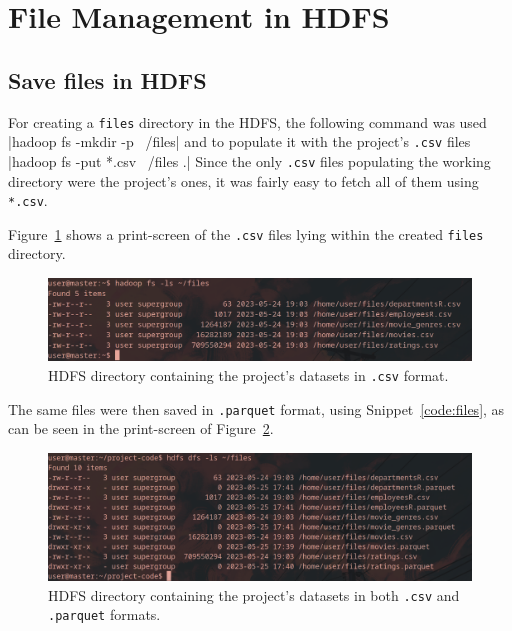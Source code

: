 \documentclass[12pt,twoside]{article}
\begin{document}
\section{File Management in HDFS}
\subsection{Save files in HDFS}
For creating a \texttt{files} directory in the HDFS, the following command was used
|hadoop fs -mkdir -p ~/files|
\noindent and to populate it with the project's \texttt{.csv} files
|hadoop fs -put *.csv ~/files .|
\noindent Since the only \texttt{.csv} files populating the working directory were the project's ones, it was fairly easy to fetch all of them using \texttt{*.csv}.

Figure~\ref{fig:files} shows a print-screen of the \texttt{.csv} files lying within the created \texttt{files} directory.

\begin{figure}[htbp]
    \centering
    \includegraphics[width=\textwidth]{./figures/files.png}
    \caption{HDFS directory containing the project's datasets in \texttt{.csv} format.}
    \label{fig:files}
\end{figure}

The same files were then saved in \texttt{.parquet} format, using Snippet~\ref{code:files}, as can be seen in the print-screen of Figure~\ref{fig:files-all}.

\begin{figure}[htbp]
    \centering
    \includegraphics[width=\textwidth]{./figures/files-all.png}
    \caption{HDFS directory containing the project's datasets in both \texttt{.csv} and \texttt{.parquet} formats.}
    \label{fig:files-all}
\end{figure}
\end{document}
